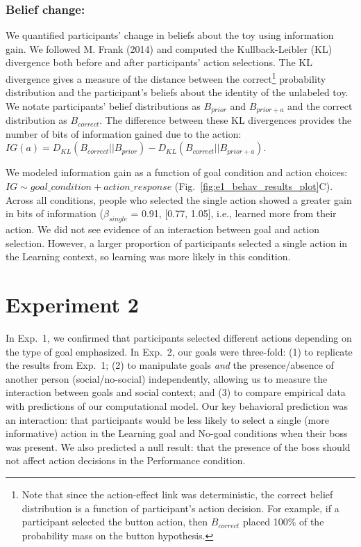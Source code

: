 \documentclass[10pt, letterpaper]{article}
\begin{document}
\subsubsection{Belief change:}\label{belief-change}

We quantified participants' change in beliefs about the toy using
information gain. We followed M. Frank (2014) and computed the
Kullback-Leibler (KL) divergence both before and after participants'
action selections. The KL divergence gives a measure of the distance
between the correct\footnote{Note that since the action-effect link was
  deterministic, the correct belief distribution is a function of
  participant's action decision. For example, if a participant selected
  the button action, then \(B_{correct}\) placed 100\% of the
  probability mass on the button hypothesis.} probability distribution
and the participant's beliefs about the identity of the unlabeled toy.
We notate participants' belief distributions as \(B_{prior}\) and
\(B_{prior+a}\) and the correct distribution as \(B_{correct}\). The
difference between these KL divergences provides the number of bits of
information gained due to the action:
\(IG(a) = D_{KL} ( B_{correct}|| B_{prior} ) - D_{KL} (B_{correct} || B_{prior+a} )\).

We modeled information gain as a function of goal condition and action
choices: \texttt{$IG \sim goal\_condition + action\_response$}
(Fig.~\ref{fig:e1_behav_results_plot}C). Across all conditions, people
who selected the single action showed a greater gain in bits of
information (\(\beta_{single}\) = 0.91, {[}0.77, 1.05{]}, i.e., learned
more from their action. We did not see evidence of an interaction
between goal and action selection. However, a larger proportion of
participants selected a single action in the Learning context, so
learning was more likely in this condition.

\section{Experiment 2}\label{experiment-2}

In Exp.~1, we confirmed that participants selected different actions
depending on the type of goal emphasized. In Exp.~2, our goals were
three-fold: (1) to replicate the results from Exp.~1; (2) to manipulate
goals \emph{and} the presence/absence of another person
(social/no-social) independently, allowing us to measure the interaction
between goals and social context; and (3) to compare empirical data with
predictions of our computational model. Our key behavioral prediction
was an interaction: that participants would be less likely to select a
single (more informative) action in the Learning goal and No-goal
conditions when their boss was present. We also predicted a null result:
that the presence of the boss should not affect action decisions in the
Performance condition.
\end{document}
